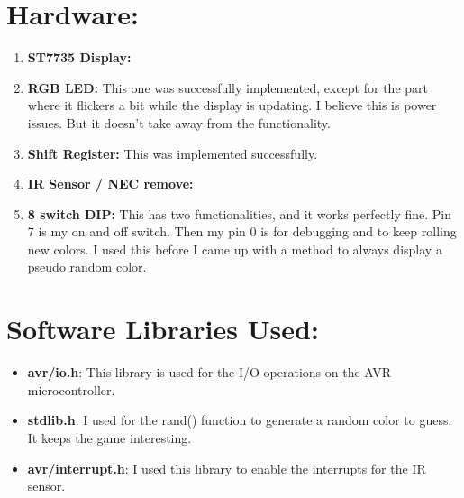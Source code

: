 \documentclass[12pt]{article}
\begin{document}
\pagebreak
\section{Hardware:}
\begin{enumerate}
  \item \textbf{ST7735 Display:}
  \item \textbf{RGB LED:}
    This one was successfully implemented, except for the part
    where it flickers a bit while the display is updating.
    I believe this is power issues. But it doesn't take away
    from the functionality.
  \item \textbf{Shift Register:} This was implemented successfully.
  \item \textbf{IR Sensor / NEC remove:}
  \item \textbf{8 switch DIP:}
    This has two functionalities, and it works perfectly fine. Pin 7 is my on and off switch.
    Then my pin 0 is for debugging and to keep rolling new colors. I used this before I came up
    with a method to always display a pseudo random color.
\end{enumerate}

\pagebreak




\pagebreak
\section{Software Libraries Used:}
\begin{itemize}
  \item \textbf{avr/io.h}:
    This library is used for the I/O operations on the AVR microcontroller.
  \item \textbf{stdlib.h}:
    I used for the rand() function to generate a random color to guess.
    It keeps the game interesting.
  \item \textbf{avr/interrupt.h}:
    I used this library to enable the interrupts for the IR sensor.
\end{itemize} 
\end{document}

